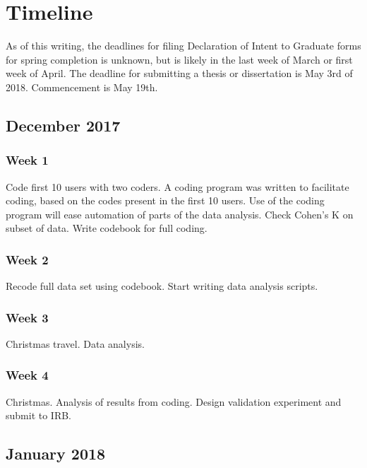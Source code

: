 \chapter{Timeline}

As of this writing, the deadlines for filing Declaration of Intent to Graduate forms for spring completion is unknown, but is likely in the last week of March or first week of April. 
The deadline for submitting a thesis or dissertation is May 3rd of 2018. 
Commencement is May 19th. 

\section{December 2017} \label{section:December_2017}

\subsection{Week 1} \label{section:Week_1}

Code first 10 users with two coders. A coding program was written to facilitate coding, based on the codes present in the first 10 users. Use of the coding program will ease automation of parts of the data analysis. 
Check Cohen's K on subset of data.
Write codebook for full coding. 

\subsection{Week 2} \label{section:Week_2}

Recode full data set using codebook.
Start writing data analysis scripts.

\subsection{Week 3} \label{section:Week_3}

Christmas travel. 
Data analysis.

\subsection{Week 4} \label{section:Week_4}

Christmas. 
Analysis of results from coding.
Design validation experiment and submit to IRB.

\section{January 2018} \label{section:January_2018}

